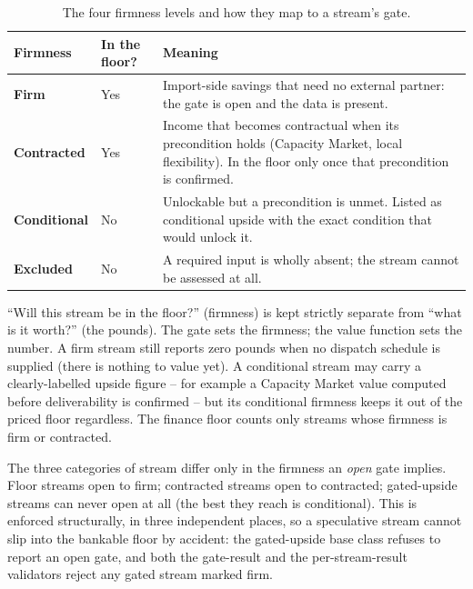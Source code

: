 \begin{table}[H]
\centering
\caption{The four firmness levels and how they map to a stream's gate.}
\label{tab:firmness}
\small\sffamily
\begin{tabularx}{\textwidth}{@{}l l L@{}}
\toprule
\textbf{Firmness} & \textbf{In the floor?} & \textbf{Meaning} \\
\midrule
\textbf{Firm} & Yes & Import-side savings that need no external partner: the gate is open and the data is present. \\
\textbf{Contracted} & Yes & Income that becomes contractual when its precondition holds (Capacity Market, local flexibility). In the floor only once that precondition is confirmed. \\
\textbf{Conditional} & No & Unlockable but a precondition is unmet. Listed as conditional upside with the exact condition that would unlock it. \\
\textbf{Excluded} & No & A required input is wholly absent; the stream cannot be assessed at all. \\
\bottomrule
\end{tabularx}
\end{table}

\begin{caution}
``Will this stream be in the floor?'' (firmness) is kept strictly separate from ``what is it worth?'' (the pounds). The gate sets the firmness; the value function sets the number. A firm stream still reports zero pounds when no dispatch schedule is supplied (there is nothing to value yet). A conditional stream may carry a clearly-labelled upside figure -- for example a Capacity Market value computed before deliverability is confirmed -- but its conditional firmness keeps it out of the priced floor regardless. The finance floor counts only streams whose firmness is firm or contracted.
\end{caution}

The three categories of stream differ only in the firmness an \emph{open} gate implies. Floor streams open to firm; contracted streams open to contracted; gated-upside streams can never open at all (the best they reach is conditional). This is enforced structurally, in three independent places, so a speculative stream cannot slip into the bankable floor by accident: the gated-upside base class refuses to report an open gate, and both the gate-result and the per-stream-result validators reject any gated stream marked firm.

